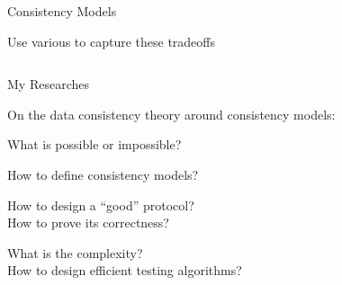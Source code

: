 \begin{frame}{Consistency Models}
	\begin{center}
		Use various  to capture these tradeoffs
	\end{center}

	\begin{columns}[c]
		\begin{center}
		\end{center}
		\begin{center}
		\end{center}
	\end{columns}

	\pause
\end{frame}

\begin{frame}{My Researches}
	\begin{center}
		On the data consistency theory around consistency models:
	\end{center}

	\pause
	\begin{description}[<+->]
		\setlength{\itemsep}{8pt}
		\item[Computability:] What is possible or impossible?
		\item[Specification:] How to define consistency models?
		\item[Protocol:] How to design a ``good'' protocol? \\[3pt]
			How to prove its correctness?
		\item[Testing:] What is the complexity? \\[3pt] How to design efficient testing algorithms?
	\end{description}

\end{frame}

